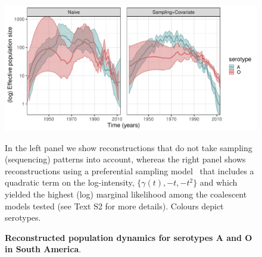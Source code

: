 \documentclass[10pt]{article}
\begin{document}
\begin{figure}[!ht]
\begin{center}
\includegraphics[scale=0.54]{FIGURES/PLOTS/population_size_reconstructions_full.pdf}
\end{center}
\caption{\textbf{Reconstructed population dynamics for serotypes A and O in South America}.
}
In the left panel we show reconstructions that do not take sampling (sequencing) patterns into account, whereas the right panel shows reconstructions using a preferential sampling model~\citep{Karcher2019} that includes a quadratic term on the log-intensity, $\{\gamma(t), -t, -t^2\}$ and which yielded the highest (log) marginal likelihood among the coalescent models tested (see Text S2 for more details).
Colours depict serotypes.

\label{fig:popdyn}
\end{figure}
\end{document}
